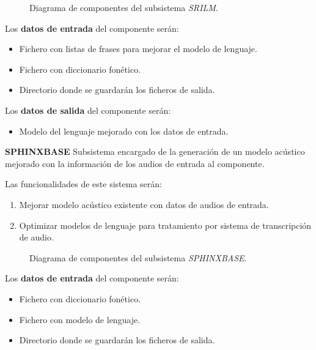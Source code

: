\documentclass[../main.tex]{subfiles}
\begin{document}
\begin{figure}[H]
    \centering
    
    \label{fig:components_srilm}
    \caption{Diagrama de componentes del subsistema \textit{SRILM}.}
\end{figure}

Los \textbf{datos de entrada} del componente serán:
\begin{itemize}
    \item Fichero con listas de frases para mejorar el modelo de lenguaje.
    \item Fichero con diccionario fonético.
    \item Directorio donde se guardarán los ficheros de salida.
\end{itemize}

Los \textbf{datos de salida} del componente serán:
\begin{itemize}
    \item Modelo del lenguaje mejorado con los datos de entrada.
\end{itemize}

\textbf{SPHINXBASE}\label{par:sphinxbase}
Subsistema encargado de la generación de un modelo acústico mejorado con la información de los audios de entrada al componente.

Las funcionalidades de este sistema serán:
\begin{enumerate}
    \item Mejorar modelo acústico existente con datos de audios de entrada.
    \item Optimizar modelos de lenguaje para tratamiento por sistema de transcripción de audio.
\end{enumerate}

\begin{figure}[H]
    \centering
    
    \label{fig:components_sphinxbase}
    \caption{Diagrama de componentes del subsistema \textit{SPHINXBASE}.}
\end{figure}

Los \textbf{datos de entrada} del componente serán:
\begin{itemize}
    \item Fichero con diccionario fonético.
    \item Fichero con modelo de lenguaje.
    \item Directorio donde se guardarán los ficheros de salida.
\end{itemize}
\end{document}
